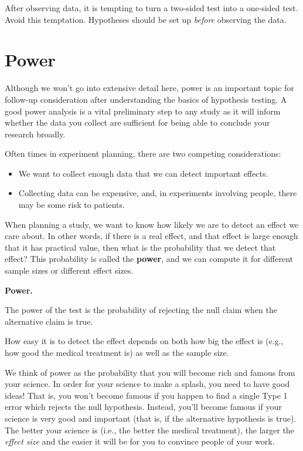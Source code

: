 \documentclass[
  10pt,
  openany]{book}
\providecommand{\tightlist}{%
  \setlength{\itemsep}{0pt}\setlength{\parskip}{0pt}}
\theoremstyle{definition}
\theoremstyle{definition}
\theoremstyle{definition}
\theoremstyle{definition}
\theoremstyle{remark}
\begin{document}
After observing data, it is tempting to turn a two-sided test into a one-sided test.
Avoid this temptation.
Hypotheses should be set up \emph{before} observing the data.

\section{Power}\label{power}

Although we won't go into extensive detail here, power is an important topic for follow-up consideration after understanding the basics of hypothesis testing.
A good power analysis is a vital preliminary step to any study as it will inform whether the data you collect are sufficient for being able to conclude your research broadly.

Often times in experiment planning, there are two competing considerations:

\begin{itemize}
\tightlist
\item
  We want to collect enough data that we can detect important effects.
\item
  Collecting data can be expensive, and, in experiments involving people, there may be some risk to patients.
\end{itemize}

When planning a study, we want to know how likely we are to detect an effect we care about.
In other words, if there is a real effect, and that effect is large enough that it has practical value, then what is the probability that we detect that effect?
This probability is called the \textbf{power}, and we can compute it for different sample sizes or different effect sizes.

\begin{onebox}
\textbf{Power.}

The power of the test is the probability of rejecting the null claim when the alternative claim is true.

How easy it is to detect the effect depends on both how big the effect is (e.g., how good the medical treatment is) as well as the sample size.

\end{onebox}

We think of power as the probability that you will become rich and famous from your science.
In order for your science to make a splash, you need to have good ideas!
That is, you won't become famous if you happen to find a single Type 1 error which rejects the null hypothesis.
Instead, you'll become famous if your science is very good and important (that is, if the alternative hypothesis is true).
The better your science is (i.e., the better the medical treatment), the larger the \emph{effect size} and the easier it will be for you to convince people of your work.
\end{document}

